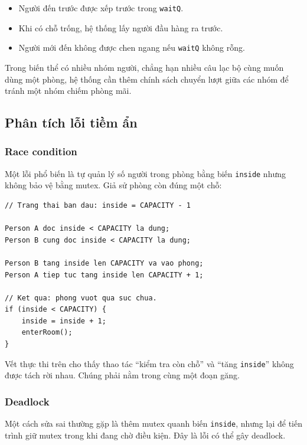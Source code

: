 \begin{itemize}
    \item Người đến trước được xếp trước trong \texttt{waitQ}.
    \item Khi có chỗ trống, hệ thống lấy người đầu hàng ra trước.
    \item Người mới đến không được chen ngang nếu \texttt{waitQ} không rỗng.
\end{itemize}

Trong biến thể có nhiều nhóm người, chẳng hạn nhiều câu lạc bộ cùng muốn
dùng một phòng, hệ thống cần thêm chính sách chuyển lượt giữa các nhóm để
tránh một nhóm chiếm phòng mãi.


\subsection{Phân tích lỗi tiềm ẩn}

\subsubsection*{Race condition}

Một lỗi phổ biến là tự quản lý số người trong phòng bằng biến
\texttt{inside} nhưng không bảo vệ bằng mutex. Giả sử phòng còn đúng một
chỗ:

\begin{lstlisting}
// Trang thai ban dau: inside = CAPACITY - 1

Person A doc inside < CAPACITY la dung;
Person B cung doc inside < CAPACITY la dung;

Person B tang inside len CAPACITY va vao phong;
Person A tiep tuc tang inside len CAPACITY + 1;

// Ket qua: phong vuot qua suc chua.
if (inside < CAPACITY) {
    inside = inside + 1;
    enterRoom();
}
\end{lstlisting}

Vết thực thi trên cho thấy thao tác ``kiểm tra còn chỗ'' và ``tăng
\texttt{inside}'' không được tách rời nhau. Chúng phải nằm trong cùng một
đoạn găng.

\subsubsection*{Deadlock}

Một cách sửa sai thường gặp là thêm mutex quanh biến \texttt{inside},
nhưng lại để tiến trình giữ mutex trong khi đang chờ điều kiện. Đây là
lỗi có thể gây deadlock.


